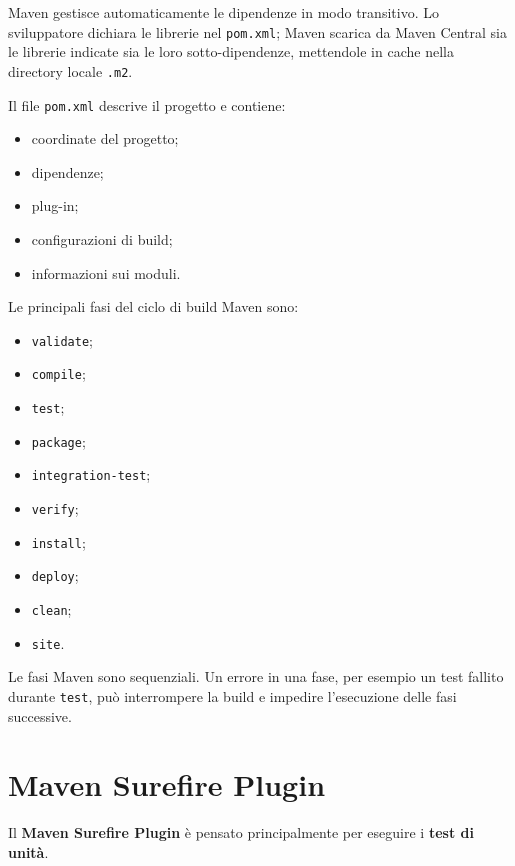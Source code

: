 \begin{notaprof}
Maven gestisce automaticamente le dipendenze in modo transitivo. Lo sviluppatore dichiara le librerie nel \texttt{pom.xml}; Maven scarica da Maven Central sia le librerie indicate sia le loro sotto-dipendenze, mettendole in cache nella directory locale \texttt{.m2}.
\end{notaprof}

Il file \texttt{pom.xml} descrive il progetto e contiene:

\begin{itemize}
    \item coordinate del progetto;
    \item dipendenze;
    \item plug-in;
    \item configurazioni di build;
    \item informazioni sui moduli.
\end{itemize}

Le principali fasi del ciclo di build Maven sono:

\begin{itemize}
    \item \texttt{validate};
    \item \texttt{compile};
    \item \texttt{test};
    \item \texttt{package};
    \item \texttt{integration-test};
    \item \texttt{verify};
    \item \texttt{install};
    \item \texttt{deploy};
    \item \texttt{clean};
    \item \texttt{site}.
\end{itemize}

\begin{notaesame}
Le fasi Maven sono sequenziali. Un errore in una fase, per esempio un test fallito durante \texttt{test}, può interrompere la build e impedire l'esecuzione delle fasi successive.
\end{notaesame}

\section{Maven Surefire Plugin}

Il \textbf{Maven Surefire Plugin} è pensato principalmente per eseguire i \textbf{test di unità}.

